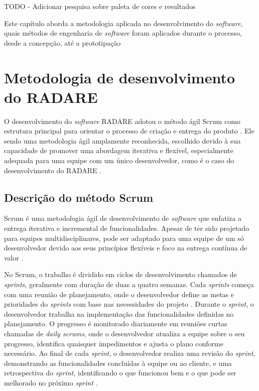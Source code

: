 TODO
- Adicionar pesquisa sobre paleta de cores e resultados

\label{Cap:Metodologia}

Este capítulo aborda a metodologia aplicada no desenvolvimento do \textit{software}, quais métodos de engenharia de \textit{software} foram aplicados durante o processo, desde a concepção, até a prototipação

\section{Metodologia de desenvolvimento do RADARE}

O desenvolvimento do \textit{software} RADARE adotou o método ágil Scrum como estrutura principal para orientar o processo de criação e entrega do produto \cite{softwareengreq}. Ele sendo uma metodologia ágil amplamente reconhecida, escolhido devido à sua capacidade de promover uma abordagem iterativa e flexível, especialmente adequada para uma equipe com um único desenvolvedor, como é o caso do desenvolvimento do RADARE \cite{scrum}.

\subsection{Descrição do método Scrum}

Scrum é uma metodologia ágil de desenvolvimento de \textit{software} que enfatiza a entrega iterativa e incremental de funcionalidades. Apesar de ter sido projetado para equipes multidisciplinares, pode ser adaptado para uma equipe de um só desenvolvedor devido aos seus princípios flexíveis e foco na entrega contínua de valor \cite{scrumlove}.
        
No Scrum, o trabalho é dividido em ciclos de desenvolvimento chamados de \textit{sprints}, geralmente com duração de duas a quatro semanas. Cada \textit{sprints} começa com uma reunião de planejamento, onde o desenvolvedor define as metas e prioridades do \textit{sprints} com base nas necessidades do projeto \cite{scrummic}. Durante o \textit{sprint}, o desenvolvedor trabalha na implementação das funcionalidades definidas no planejamento. O progresso é monitorado diariamente em reuniões curtas chamadas de \textit{daily scrums}, onde o desenvolvedor atualiza a equipe sobre o seu progresso, identifica quaisquer impedimentos e ajusta o plano conforme necessário. Ao final de cada \textit{sprint}, o desenvolvedor realiza uma revisão do \textit{sprint}, demonstrando as funcionalidades concluídas à equipe ou ao cliente, e uma retrospectiva do \textit{sprint}, identificando o que funcionou bem e o que pode ser melhorado no próximo \textit{sprint} \cite{scrumproj}.
        
